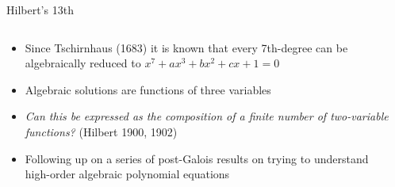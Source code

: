 


\begin{frame}{Hilbert's 13th}

\begin{columns}

  \begin{column}{7.5cm}
  \begin{itemize}
  \item Since Tschirnhaus (1683) it is known that every 7th-degree can be
    algebraically reduced to $x^{7}+ax^{3}+bx^{2}+cx+1=0$
  \item Algebraic solutions are functions of three variables
  \item \emph{Can this be expressed as the composition of a finite number
    of two-variable functions?} (Hilbert 1900, 1902)
  \item Following up on a series of post-Galois results on trying to
    understand high-order algebraic polynomial equations
  \end{itemize}
  \end{column}

  \begin{column}{4.5cm}
  \end{column}

\end{columns}

\end{frame}



